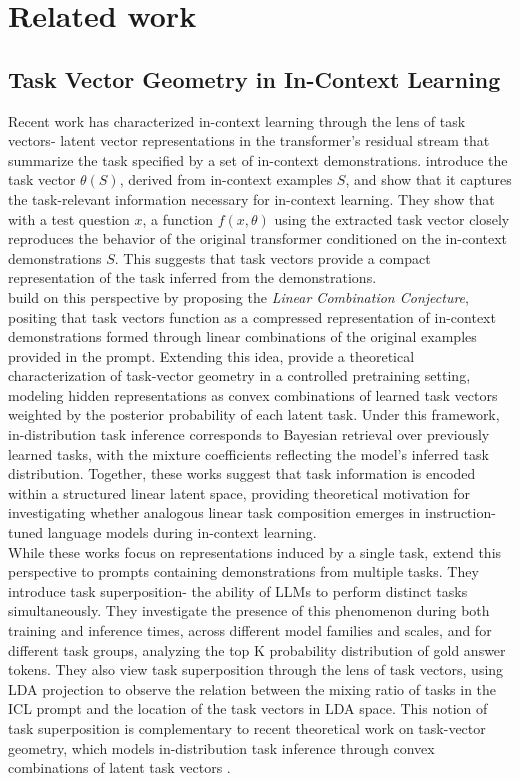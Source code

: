 \documentclass[11pt]{article}
\begin{document}
\section{Related work}
\subsection*{Task Vector Geometry in In-Context Learning}
Recent work has characterized in-context learning through the lens of task vectors- latent vector representations in the transformer's residual stream that summarize the task specified by a set of in-context demonstrations. \citet{Hendel2023-yk} introduce the task vector \(\theta(S)\), derived from in-context examples \(S\), and show that it captures the task-relevant information necessary for in-context learning. They show that with a test question \(x\), a function \(f(x, \theta)\) using the extracted task vector closely reproduces the behavior of the original transformer conditioned on the in-context demonstrations \(S\). This suggests that task vectors provide a compact representation of the task inferred from the demonstrations. \\[1em]
\citet{Dong2025-jo} build on this perspective by proposing the \textit{Linear Combination Conjecture}, positing that task vectors function as a compressed representation of in-context demonstrations formed through linear combinations of the original examples provided in the prompt. Extending this idea, \citet{yan2026taskvectorgeometryunderlies} provide a theoretical characterization of task-vector geometry in a controlled pretraining setting, modeling hidden representations as convex combinations of learned task vectors weighted by the posterior probability of each latent task. Under this framework, in-distribution task inference corresponds to Bayesian retrieval over previously learned tasks, with the mixture coefficients reflecting the model’s inferred task distribution. Together, these works suggest that task information is encoded within a structured linear latent space, providing theoretical motivation for investigating whether analogous linear task composition emerges in instruction-tuned language models during in-context learning. \\[1em]
While these works focus on representations induced by a single task, \citet{xiong2024oncellmsincontextlearn} extend this perspective to prompts containing demonstrations from multiple tasks. They introduce task superposition- the ability of LLMs to perform distinct tasks simultaneously. They investigate the presence of this phenomenon during both training and inference times, across different model families and scales, and for different task groups, analyzing the top K probability distribution of gold answer tokens. They also view task superposition through the lens of task vectors, using LDA projection to observe the relation between the mixing ratio of tasks in the ICL prompt and the location of the task vectors in LDA space. This notion of task superposition is complementary to recent theoretical work on task-vector geometry, which models in-distribution task inference through convex combinations of latent task vectors \citep{yan2026taskvectorgeometryunderlies}. \\[1em]
\end{document}
